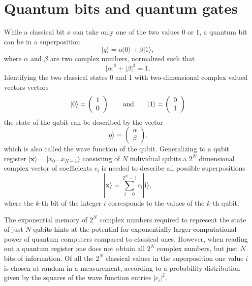 \documentclass[journal]{IEEEtran}
\begin{document}
\appendices
\section{Quantum bits and quantum gates}
\label{sec:box1}
While a classical bit $x$ can take only one of the two values $0$ or $1$, a quantum bit can be in a superposition
\begin{equation}
|q\rangle = \alpha |0\rangle +\beta|1\rangle,
\end{equation}
where $\alpha$ and $\beta$ are two complex numbers, normalized such that
\begin{equation}
|\alpha|^2+|\beta|^2=1.
\end{equation}
 Identifying the two classical states 0 and 1 with two-dimensional complex valued vectors vectors 
 \begin{equation}
 |0\rangle = \left(\begin{array}{c}1\\0\end{array}\right) \qquad {\rm and} \qquad  |1\rangle = \left(\begin{array}{c}0\\1\end{array}\right)
 \end{equation}
  the state of the qubit can be described by the vector 
  \begin{equation}
  |q\rangle = \left(\begin{array}{c}\alpha\\\beta\end{array}\right),
  \end{equation} which is also called the wave function of the qubit. Generalizing to a qubit register $| \mathbf{x}\rangle=|x_0\ldots x_{N-1}\rangle$ consisting of $N$ individual qubits a $2^N$ dimensional complex vector of coefficients $c_i$ is needed to describe all possible superpositions
  \begin{equation}
  |\mathbf{x}\rangle = \sum_{i=0}^{2^N-1} c_i |\mathbf{i}\rangle,
  \end{equation}
where the $k$-th bit of the integer $i$ corresponds to the values of the $k$-th qubit.

The exponential memory of $2^N$ complex numbers required to represent the state of just $N$ qubits hints at the potential for exponentially larger computational power of quantum computers compared to classical ones. However, when reading out a quantum register one does not obtain all $2^N$ complex numbers, but just $N$ bits of information. Of all the $2^N$ classical values in the superposition one value $i$ is chosen at random in a measurement, according to a probability distribution given by the squares of the wave function entries $|c_i|^2$.
\end{document}
